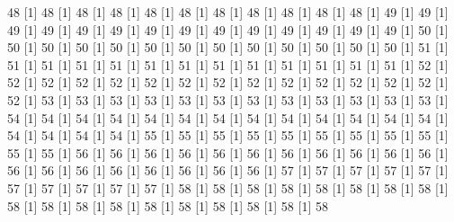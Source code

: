 \documentclass[12pt]{article}
\begin{document}
\begin{Schunk}
\begin{Soutput}
[1] 48%
[1] 48%
[1] 48%
[1] 48%
[1] 48%
[1] 48%
[1] 48%
[1] 48%
[1] 48%
[1] 48%
[1] 48%
[1] 49%
[1] 49%
[1] 49%
[1] 49%
[1] 49%
[1] 49%
[1] 49%
[1] 49%
[1] 49%
[1] 49%
[1] 49%
[1] 49%
[1] 49%
[1] 49%
[1] 50%
[1] 50%
[1] 50%
[1] 50%
[1] 50%
[1] 50%
[1] 50%
[1] 50%
[1] 50%
[1] 50%
[1] 50%
[1] 50%
[1] 50%
[1] 51%
[1] 51%
[1] 51%
[1] 51%
[1] 51%
[1] 51%
[1] 51%
[1] 51%
[1] 51%
[1] 51%
[1] 51%
[1] 51%
[1] 51%
[1] 52%
[1] 52%
[1] 52%
[1] 52%
[1] 52%
[1] 52%
[1] 52%
[1] 52%
[1] 52%
[1] 52%
[1] 52%
[1] 52%
[1] 52%
[1] 52%
[1] 52%
[1] 53%
[1] 53%
[1] 53%
[1] 53%
[1] 53%
[1] 53%
[1] 53%
[1] 53%
[1] 53%
[1] 53%
[1] 53%
[1] 53%
[1] 54%
[1] 54%
[1] 54%
[1] 54%
[1] 54%
[1] 54%
[1] 54%
[1] 54%
[1] 54%
[1] 54%
[1] 54%
[1] 54%
[1] 54%
[1] 54%
[1] 54%
[1] 54%
[1] 54%
[1] 55%
[1] 55%
[1] 55%
[1] 55%
[1] 55%
[1] 55%
[1] 55%
[1] 55%
[1] 55%
[1] 55%
[1] 55%
[1] 56%
[1] 56%
[1] 56%
[1] 56%
[1] 56%
[1] 56%
[1] 56%
[1] 56%
[1] 56%
[1] 56%
[1] 56%
[1] 56%
[1] 56%
[1] 56%
[1] 56%
[1] 56%
[1] 56%
[1] 56%
[1] 56%
[1] 57%
[1] 57%
[1] 57%
[1] 57%
[1] 57%
[1] 57%
[1] 57%
[1] 57%
[1] 57%
[1] 57%
[1] 58%
[1] 58%
[1] 58%
[1] 58%
[1] 58%
[1] 58%
[1] 58%
[1] 58%
[1] 58%
[1] 58%
[1] 58%
[1] 58%
[1] 58%
[1] 58%
[1] 58%
[1] 58%
[1] 58%
[1] 58%

\end{Soutput}
\end{Schunk}
\end{document}
